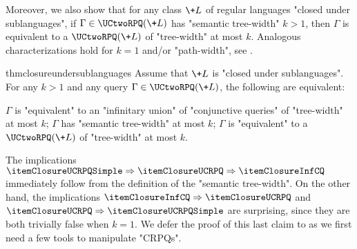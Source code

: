 
Moreover, we also show that for any class $\+L$ of regular languages "closed under sublanguages", if $\Gamma \in \UCtwoRPQ(\+L)$ has "semantic tree-width" $k > 1$,
then $\Gamma$ is equivalent to a $\UCtwoRPQ(\+L)$ of "tree-width" at most $k$.
Analogous characterizations hold for $k=1$ and/or "path-width", see .

\begin{restatable*}{thm}{closureundersublanguages}
    \AP\label{thm:closure-under-sublanguages}
    \AP Assume that $\+L$ is "closed under sublanguages". 
    For any $k > 1$ and any query $\Gamma \in \UCtwoRPQ(\+L)$, the following are equivalent:
    \begin{enumerate}
        \itemAP[\introinrestatable{\itemClosureInfCQ}] $\Gamma$ is "equivalent" to an "infinitary union" of "conjunctive queries"
            of "tree-width" at most $k$; \label{thm:closure-under-sublanguages:1}
        \itemAP[\introinrestatable{\itemClosureUCRPQ}] $\Gamma$ has "semantic tree-width" at most $k$; \label{thm:closure-under-sublanguages:2}
        \itemAP[\introinrestatable{\itemClosureUCRPQSimple}] $\Gamma$ is "equivalent" to a $\UCtwoRPQ(\+L)$ of "tree-width" at most $k$. \label{thm:closure-under-sublanguages:3}
    \end{enumerate}
\end{restatable*}

The implications $\itemClosureUCRPQSimple \Rightarrow \itemClosureUCRPQ \Rightarrow \itemClosureInfCQ$ immediately follow
from the definition of the "semantic tree-width".
On the other hand, the
implications $\itemClosureInfCQ \Rightarrow \itemClosureUCRPQ$ and $\itemClosureUCRPQ \Rightarrow \itemClosureUCRPQSimple$ are surprising,
since they are both trivially false when $k=1$. We defer the proof of this last claim
to  as we first need a few tools to manipulate "CRPQs".

